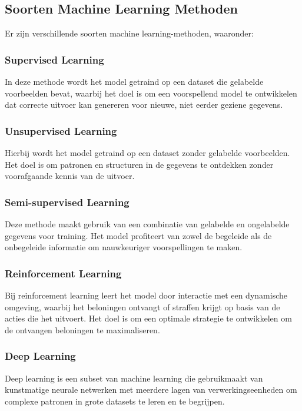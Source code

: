 \subsection{Soorten Machine Learning Methoden}

Er zijn verschillende soorten machine learning-methoden, waaronder:

\subsubsection{Supervised Learning}
In deze methode wordt het model getraind op een dataset die gelabelde voorbeelden bevat, waarbij het doel is om een voorspellend model te ontwikkelen dat correcte uitvoer kan genereren voor nieuwe, niet eerder geziene gegevens.

\subsubsection{Unsupervised Learning}
Hierbij wordt het model getraind op een dataset zonder gelabelde voorbeelden. Het doel is om patronen en structuren in de gegevens te ontdekken zonder voorafgaande kennis van de uitvoer.

\subsubsection{Semi-supervised Learning}
Deze methode maakt gebruik van een combinatie van gelabelde en ongelabelde gegevens voor training. Het model profiteert van zowel de begeleide als de onbegeleide informatie om nauwkeuriger voorspellingen te maken.

\subsubsection{Reinforcement Learning}
Bij reinforcement learning leert het model door interactie met een dynamische omgeving, waarbij het beloningen ontvangt of straffen krijgt op basis van de acties die het uitvoert. Het doel is om een optimale strategie te ontwikkelen om de ontvangen beloningen te maximaliseren.

\subsubsection{Deep Learning}
Deep learning is een subset van machine learning die gebruikmaakt van kunstmatige neurale netwerken met meerdere lagen van verwerkingseenheden om complexe patronen in grote datasets te leren en te begrijpen.

